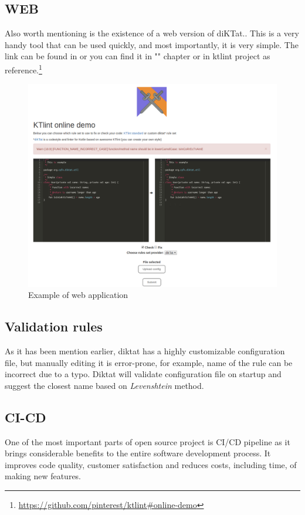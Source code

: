 \subsection{WEB}
\par
Also worth mentioning is the existence of a web version of diKTat.. This is a very handy tool that can be used quickly, and most importantly, it is very simple. The link can be found in or you can find it in "" chapter or in ktlint project as reference.\footnote{\url{https://github.com/pinterest/ktlint\#online-demo}}
\begin{figure}[H]
  \centering
  \includegraphics[scale=0.3]{pictures/web-example.png}
  \caption{Example of web application} 
\end{figure} 

\subsection{Validation rules}
\par
As it has been mention earlier, diktat has a highly customizable configuration file, but manually editing it is error-prone, for example, name of the rule can be incorrect due to a typo. Diktat will validate configuration file on startup and suggest the closest name based on \textsl{Levenshtein} method.

\subsection{CI-CD}
\par
One of the most important parts of open source project is CI/CD pipeline as it brings considerable benefits to the entire software development process. It improves code quality, customer satisfaction and reduces costs, including time, of making new features.